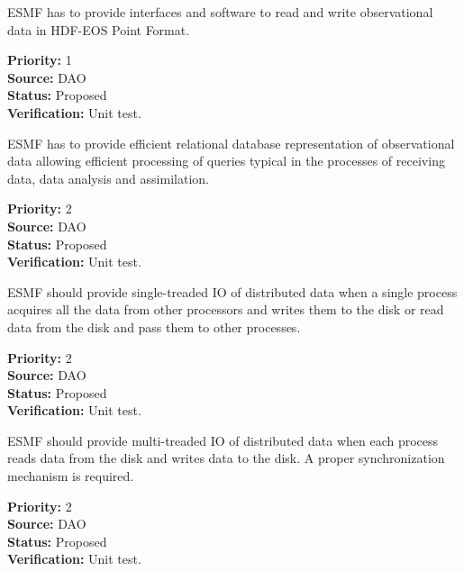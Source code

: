 
ESMF has to provide interfaces and software to read and write
observational data in HDF-EOS Point Format.

\begin{reqlist}
{\bf Priority:} 1 \\
{\bf Source:} DAO \\
{\bf Status:} Proposed \\
{\bf Verification:} Unit test. \\
\end{reqlist}


ESMF has to provide efficient relational database representation of
observational data allowing efficient processing of queries typical in
the processes of receiving data, data analysis and assimilation.

\begin{reqlist}
{\bf Priority:} 2 \\
{\bf Source:} DAO \\
{\bf Status:} Proposed \\
{\bf Verification:} Unit test.
\end{reqlist}





ESMF should provide single-treaded IO of distributed data when a
single process acquires all the data from other processors and writes
them to the disk or read data from the disk and pass them to other processes. 


\begin{reqlist}
{\bf Priority:} 2 \\
{\bf Source:} DAO \\
{\bf Status:} Proposed \\
{\bf Verification:} Unit test.
\end{reqlist}



ESMF should provide multi-treaded IO of distributed data when each
process reads data from the disk and writes data to the disk. A proper
synchronization mechanism is required. 

\begin{reqlist}
{\bf Priority:} 2 \\
{\bf Source:} DAO \\
{\bf Status:} Proposed \\
{\bf Verification:} Unit test.
\end{reqlist}


